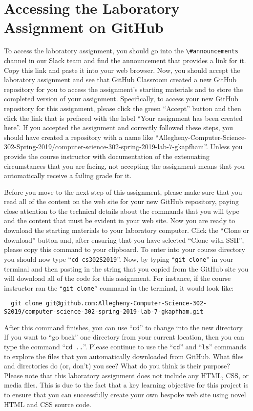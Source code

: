 \documentclass[11pt]{article}
\newcommand{\command}[1]{``\lstinline{#1}''}
\newcommand{\channel}[1]{\lstinline{#1}}
\newcommand{\step}[1]{``{#1}''}
\begin{document}
\section*{Accessing the Laboratory Assignment on GitHub}

To access the laboratory assignment, you should go into the
\channel{\#announcements} channel in our Slack team and find the announcement
that provides a link for it. Copy this link and paste it into your web browser.
Now, you should accept the laboratory assignment and see that GitHub Classroom
created a new GitHub repository for you to access the assignment's starting
materials and to store the completed version of your assignment. Specifically,
to access your new GitHub repository for this assignment, please click the green
``Accept'' button and then click the link that is prefaced with the label ``Your
assignment has been created here''. If you accepted the assignment and correctly
followed these steps, you should have created a repository with a name like
``Allegheny-Computer-Science-302-Spring-2019/computer-science-302-spring-2019-lab-7-gkapfham''.
Unless you provide the course instructor with documentation of the extenuating
circumstances that you are facing, not accepting the assignment means that you
automatically receive a failing grade for it.

Before you move to the next step of this assignment, please make sure that you
read all of the content on the web site for your new GitHub repository, paying
close attention to the technical details about the commands that you will type
and the content that must be evident in your web site. Now you are ready to
download the starting materials to your laboratory computer. Click the ``Clone
or download'' button and, after ensuring that you have selected ``Clone with
SSH'', please copy this command to your clipboard. To enter into your course
directory you should now type \command{cd cs302S2019}. Now, by typing
\command{git clone} in your terminal and then pasting in the string that you
copied from the GitHub site you will download all of the code for this
assignment. For instance, if the course instructor ran the \command{git clone}
command in the terminal, it would look like:

\begin{lstlisting}
  git clone git@github.com:Allegheny-Computer-Science-302-S2019/computer-science-302-spring-2019-lab-7-gkapfham.git
\end{lstlisting}

After this command finishes, you can use \command{cd} to change into the new
directory. If you want to \step{go back} one directory from your current
location, then you can type the command \command{cd ..}. Please continue to use
the \command{cd} and \command{ls} commands to explore the files that you
automatically downloaded from GitHub. What files and directories do (or, don't)
you see? What do you think is their purpose? Please note that this laboratory
assignment does not include any HTML, CSS, or media files. This is due to the
fact that a key learning objective for this project is to ensure that you can
successfully create your own bespoke web site using novel HTML and CSS source
code.
\end{document}
